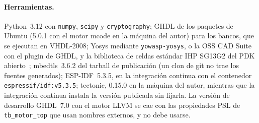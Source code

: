 \paragraph{Herramientas.} Python~3.12 con \texttt{numpy}, \texttt{scipy} y
\texttt{cryptography}; GHDL de los paquetes de Ubuntu (5.0.1 con el motor
mcode en la máquina del autor) para los bancos, que se ejecutan en
\acs{VHDL}-2008; Yosys mediante \texttt{yowasp-yosys}, o la OSS CAD Suite
con el plugin de GHDL, y la biblioteca de celdas estándar IHP SG13G2 del
\ac{PDK} abierto~\cite{ihp_openpdk_repo}; mbedtls~3.6.2 del tarball de
publicación (un clon de git no trae los fuentes generados); ESP-IDF~5.3.5,
en la integración continua con el contenedor \nolinkurl{espressif/idf:v5.3.5};
tectonic, 0.15.0 en la máquina del autor, mientras que la integración
continua instala la versión publicada sin fijarla. La versión de desarrollo GHDL~7.0 con el motor LLVM se cae
con las propiedades \acs{PSL} de \texttt{tb\_motor\_top} que usan nombres
externos, y no debe usarse.

